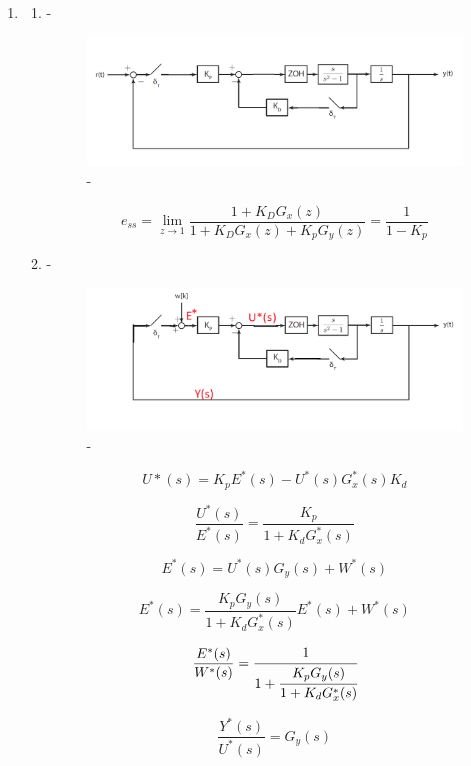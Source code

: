 \documentclass[a4paper,12pt]{article}
\begin{document}
\begin{enumerate}
	
	
	
	\item 
	
	\begin{enumerate}
	\item -
	
		\begin{figure}[H]
			\center
			\setlength{\unitlength}{\textwidth} 
		\includegraphics[width=1.0\unitlength]{images/a}
  		\caption{\label{fig:a}-}
	\end{figure}
	
		$$ e_{ss}=\lim_{ z \to 1}\frac{1+K_DG_x(z)}{1+K_DG_x(z)+K_pG_y(z)}=\frac{1}{1-K_p}$$
	
	\item -
	
		\begin{figure}[H]
			\center
			\setlength{\unitlength}{\textwidth} 
		\includegraphics[width=1.0\unitlength]{images/b}
  		\caption{\label{fig:a}-}
	\end{figure}
	
		$$ U*(s)=K_pE^*(s)-U^*(s)G_x^*(s)K_d $$
		
		$$ \frac{U^*(s)}{E^*(s)}=\frac{K_p}{1+K_dG_x^*(s)}$$
		
		$$ E^*(s)=U^*(s)G_y(s)+W^*(s) $$
		
		$$ E^*(s)=\frac{K_pG_y(s)}{1+K_dG_x^*(s)}E^*(s)+W^*(s) $$
		
		$$ \frac{E^*(s)}{W^*(s)}=\cfrac{1}{1+\cfrac{K_pG_y(s)}{1+K_dG_x^*(s)}}$$
		
		$$ \frac{Y^*(s)}{U^*(s)}=G_y(s)$$
		

\end{enumerate}
\end{enumerate}
\end{document}
